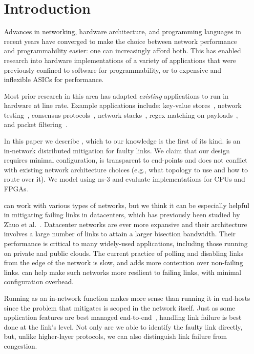 \section{Introduction}
Advances in networking, hardware architecture, and programming
languages in recent years have converged to make the choice between
network performance and programmability easier: one can increasingly
afford both.
This has enabled research into hardware implementations of a variety
of applications that were previously confined to software for
programmability, or to expensive and inflexible ASICs for performance.

Most prior research in this area has adapted \emph{existing}
applications to run in hardware at line rate.
Example applications include:
key-value stores~\cite{Li:2017:KHI:3132747.3132756},
network testing~\cite{Shahbaz:2013:AOS:2537857.2537880},
consensus protocols~\cite{Istvan:2016:CBI:2930611.2930639},
network stacks~\cite{Istvan:2016:CBI:2930611.2930639},
regex matching on payloads~\cite{Woods:2010:CED:1920841.1920926},
and packet filtering~\cite{Fiessler:2016:HVH:2881025.2881033}.

In this paper we describe \OurSys, which to our knowledge is the first
of its kind. \OurSys is an in-network distributed
mitigation for faulty links.  We claim that our design requires
minimal configuration, is transparent to
end-points and does not conflict
with existing network architecture choices (e.g., what topology to use
and how to route over it). We model \OurSys using ns-3 and evaluate
implementations for CPUs and FPGAs.

\OurSys can work with various types of networks, but we think it can
be especially helpful in mitigating failing links in datacenters,
which has previously been studied by Zhuo et
al.~\cite{Zhuo:2017:UMP:3098822.3098849}.
Datacenter networks are ever more expansive and their architecture
involves a large number of links to attain a larger bisection
bandwidth. Their performance is critical to many widely-used
applications, including those running on private and public clouds.
The current practice of polling and disabling links from the edge of
the network is slow, and adds more contention over non-failing links.
\OurSys can help make such networks more resilient to failing links, with minimal configuration overhead.

Running \OurSys as an in-network function makes more sense than
running it in end-hosts since the problem that \OurSys mitigates is
scoped in the network itself. Just as some application features are
best managed end-to-end~\cite{Saltzer84end-to-endarguments}, handling
link failure is best done at the link's level. Not only are we able to
identify the faulty link directly, but, unlike higher-layer protocols,
we can also distinguish link failure from congestion.

